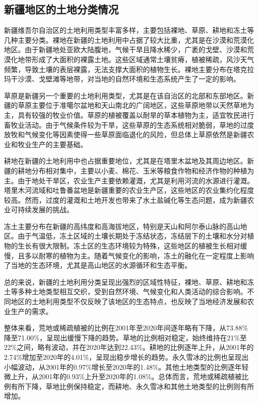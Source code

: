 \documentclass[AutoFakeBold]{LZUThesis-PgD&PhD}
\begin{document}
    \subsection{新疆地区的土地分类情况}
    
    \par 新疆维吾尔自治区的土地利用类型丰富多样，主要包括裸地、草原、耕地和冻土等几种主要分类。裸地在新疆的土地利用中占据了较大比重，尤其是在沙漠和荒漠化地区。由于新疆地处亚欧大陆腹地，气候干旱且降水稀少，广袤的戈壁、沙漠和荒漠化地带形成了大面积的裸露土地。这些区域通常土壤贫瘠，植被稀疏，风沙天气频繁，导致土壤的表层裸露，无法支撑大面积的植物生长。裸地主要分布在塔克拉玛干沙漠、戈壁滩等地带，对当地的自然环境和生态系统产生了一定的影响。

    草原是新疆另一个重要的土地利用类型，尤其是在该自治区的北部和东部地区。新疆的草原主要位于准噶尔盆地和天山南北的广阔地区，这些草原地带以天然草地为主，具有较强的牧业价值。草原的植被覆盖以耐旱的草本植物为主，适宜牧民进行畜牧业活动。由于气候条件较为干旱，这些草原的生态系统相对脆弱，草地的过度放牧和气候变化等因素使得一些草原面临退化的风险，但总体上草原依然是新疆农业和牧业生产的主要基础。
    
    耕地在新疆的土地利用中也占据重要地位，尤其是在塔里木盆地及其周边地区。新疆的耕地分布相对集中，主要以小麦、棉花、玉米等粮食作物和经济作物的种植为主。由于地处干旱区，农业生产主要依赖灌溉，尤其是利用河流的水源进行灌溉。塔里木河流域和吐鲁番盆地是新疆重要的农业生产区，这些地区的农业集约化程度较高。然而，过度的灌溉和土地开发也带来了水土盐碱化等生态问题，成为新疆农业可持续发展的挑战。
    
    冻土主要分布在新疆的高纬度和高海拔地区，特别是天山和阿尔泰山脉的高山地区。由于气温低，冻土区域的土壤长期处于冻结状态，冻结层下的土壤和水分对植物的生长有很大限制。冻土区的生态环境较为特殊，这些地区的植被生长相对缓慢，且多以耐寒的植物为主。随着气候变化的影响，冻土的融化在一定程度上影响了当地的生态环境，尤其是高山地区的水源循环和生态平衡。
    
    总的来说，新疆的土地利用分类呈现出强烈的区域性特征，裸地、草原、耕地和冻土等多种土地类型相互交织，受到自然环境、气候变化和人类活动的综合影响。不同地区的土地利用类型不仅反映了该地区的生态特点，也反映了当地经济发展和农业生产的需求。
    
    整体来看，荒地或稀疏植被的比例在2001年至2020年间逐年略有下降，从73.88\%降至71.00\%，呈现出缓慢下降的趋势。草地的比例相对稳定，始终维持在21\%至22\%之间，略有波动，并在2020年达到22.43\%。耕地的比例逐年上升，从2001年的2.74\%增加至2020年的4.01\%，呈现出稳步增长的趋势。永久雪冰的比例也呈现出小幅波动，从2001年的0.97\%增长至2020年的1.48\%。其他土地类型的比例逐年轻微上升，从2001年的0.93\%上升至2020年的1.08\%。总体而言，荒地或稀疏植被比例有所下降，草地比例保持稳定，而耕地、永久雪冰和其他土地类型的比例则有所增加。
    
\end{document}
